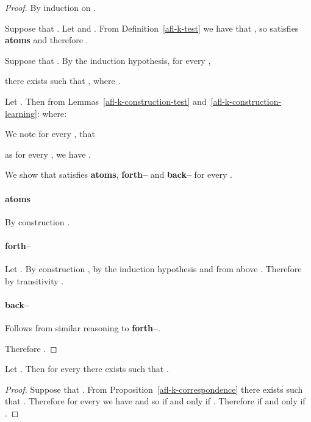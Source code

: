 \documentclass[twoside]{aiml14}
\begin{document}
  \begin{proof}
      By induction on .

      Suppose that .
      Let  and
      . 
      From Definition~\ref{afl-k-test} we have that
      , so
       satisfies 
      {\bf atoms} and therefore 
      .

      Suppose that . 
      By the induction hypothesis, for every , 
       
      there exists  such that 
      ,
      where .
      
      Let . 
      Then from Lemmas~\ref{afl-k-construction-test} and~\ref{afl-k-construction-learning}:  where:
      

      We note for every , 
       that
      
      as for every , 
       we have 
      .
      
      We show that 
      satisfies {\bf atoms}, {\bf forth--} and {\bf back--} 
      for every .

      \paragraph{atoms} By construction
      .

      \paragraph{forth--} 
      Let .
      By construction , 
      by the induction hypothesis  
      and from above .
      Therefore by transitivity .

      \paragraph{back--} Follows from similar reasoning to {\bf forth--}.

      Therefore .
  \end{proof}

  \begin{corollary}\label{afl-k-correspondence-aml-allacts}
      Let .
      Then for every 
      there exists  
      such that .
  \end{corollary}

  \begin{proof}
      Suppose that .
      From Proposition~\ref{afl-k-correspondence} 
      there exists  
      such that .
      Therefore for every 
      we have 
      and so 
      if and only if .
      Therefore 
      if and only if .
  \end{proof}
\end{document}
